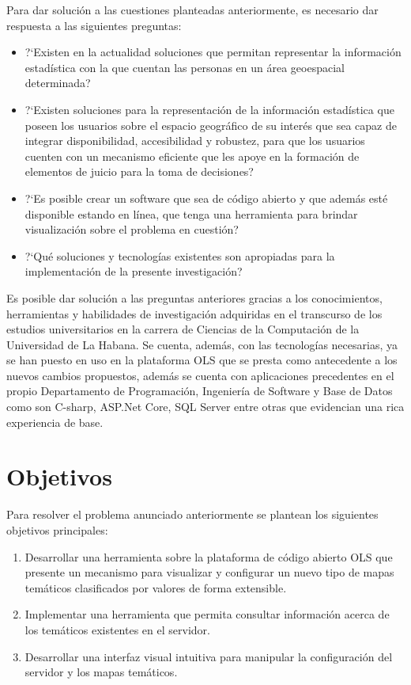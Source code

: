 Para dar soluci\'on a las cuestiones planteadas anteriormente, es necesario dar respuesta a las siguientes preguntas:

\begin{itemize}
\item ?`Existen en la actualidad soluciones que permitan representar la informaci\'on estad\'istica con la que cuentan las personas en un \'area geoespacial determinada?
\item ?`Existen soluciones para la representaci\'on de la informaci\'on estad\'istica que poseen los usuarios sobre el espacio geogr\'afico de su inter\'es que sea capaz de integrar disponibilidad, accesibilidad y robustez, para que los usuarios cuenten
con un mecanismo eficiente que les apoye en la formaci\'on de elementos de juicio para la toma de decisiones?
\item ?`Es posible crear un software que sea de c\'odigo abierto y que adem\'as est\'e disponible estando en l\'inea, que tenga una herramienta para brindar visualizaci\'on sobre el problema en cuesti\'on?
\item ?`Qu\'e soluciones y tecnolog\'ias existentes son apropiadas para la implementaci\'on de la presente investigaci\'on?
\end{itemize}

Es posible dar soluci\'on a las preguntas anteriores gracias a los conocimientos, herramientas y habilidades de investigaci\'on adquiridas en el transcurso de los estudios universitarios en la carrera de Ciencias de la Computaci\'on de la Universidad de La Habana. Se cuenta, adem\'as, con las tecnolog\'ias necesarias, ya se han puesto en uso en la plataforma OLS que se presta como antecedente a los nuevos cambios propuestos, adem\'as se cuenta con aplicaciones precedentes en el propio Departamento de Programaci\'on, Ingenier\'ia de Software y Base de Datos como son C-sharp, ASP.Net Core, SQL Server entre otras que evidencian una rica experiencia de base.


\section{Objetivos}
Para resolver el problema anunciado anteriormente se plantean los siguientes objetivos principales:

\begin{enumerate}
\item Desarrollar una herramienta sobre la plataforma de c\'odigo abierto OLS que presente un mecanismo para visualizar y configurar un nuevo tipo de mapas tem\'aticos clasificados por valores de forma extensible.
\item Implementar una herramienta que permita consultar informaci\'on acerca de los tem\'aticos existentes en el servidor.
\item Desarrollar una interfaz visual intuitiva para manipular la configuraci\'on del servidor y los mapas tem\'aticos.
\end{enumerate}

